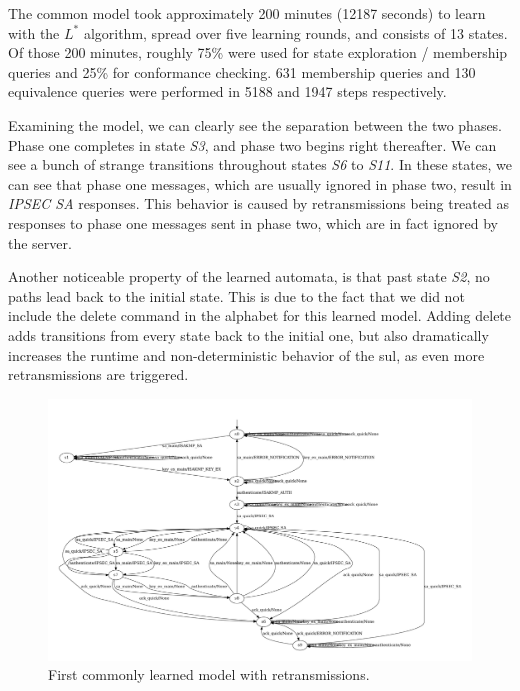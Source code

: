 The common model took approximately 200 minutes (12187 seconds) to learn with the $L^*$ algorithm, spread over five learning rounds, and consists of 13 states. Of those 200 minutes, roughly 75\% were used for state exploration / membership queries and 25\% for conformance checking. 631 membership queries and 130 equivalence queries were performed in 5188 and 1947 steps respectively.  

Examining the model, we can clearly see the separation between the two phases. Phase one completes in state \emph{S3}, and phase two begins right thereafter. We can see a bunch of strange transitions throughout states \emph{S6} to \emph{S11}. In these states, we can see that phase one messages, which are usually ignored in phase two, result in \emph{IPSEC SA} responses. This behavior is caused by retransmissions being treated as responses to phase one messages sent in phase two, which are in fact ignored by the server. 

Another noticeable property of the learned automata, is that past state \emph{S2}, no paths lead back to the initial state. This is due to the fact that we did not include the delete command in the alphabet for this learned model. Adding delete adds transitions from every state back to the initial one, but also dramatically increases the runtime and non-deterministic behavior of the \ac{sul}, as even more retransmissions are triggered.

\begin{figure}[h]
	\centering
	\includegraphics[width=\linewidth]{images/models/retrans_case1_lstar}
	\caption{First commonly learned model with retransmissions.}
	\label{fig:nofiltera}
\end{figure}

